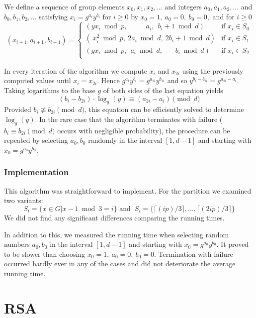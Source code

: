 \documentclass[a4paper, 11pt]{article}
\begin{document}
 We define a sequence of group elements $x_0, x_1, x_2, \ldots$ and integers $a_0, a_1, a_2, \ldots$ and $b_0, b_1, b_2, \ldots$ satisfying $x_i = g^{a_i}y^{b_i}$ for $i \ge 0$ by $x_0 = 1, ~a_0 = 0, ~b_0 = 0,$ and for $i \ge 0$  \[(x_{i+1},a_{i+1},b_{i+1}) = \left\{\begin{array}{lr} 
         (y x_i \bmod p,~~~~~~~~~~~~a_i,~~b_i + 1 \bmod d) & \textrm{if } x_i \in S_0\\ 
         (~x_i^2 \bmod p,~2 a_i \bmod d,~2 b_i + 1 \bmod d) & \textrm{if } x_i \in S_1\\ 
         (g x_i \bmod p,~~a_i \bmod d,~~~~~~~~b_i \bmod d) & \textrm{if } x_i \in S_2\\ 
     \end{array} \right. \] 
      
 In every iteration of the algorithm we compute $x_i$ and $x_{2i}$ using the previously computed values until $x_i = x_{2i}$. Hence $g^{a_i}y^{b_i} = g^{a_{2i}}y^{b_{2i}}$ and so $y^{b_i - b_{2i}} = g^{a_{2i} - a_i}$. Taking logarithms to the base $g$ of both sides of the last equation yields 
 \[ (b_i - b_{2i}) \cdot \log_g(y) \equiv (a_{2i} - a_i)\pmod d \] 
 Provided $b_i \not\equiv b_{2i} \pmod d$, this equation can be efficiently solved to determine $\log_g(y)$. 
 In the rare case that the algorithm terminates with failure ($b_i \equiv b_{2i} \pmod d$ occurs with negligible probability), the procedure can be repeated by selecting $a_0, b_0$ randomly in the interval $[1,d-1]$ and starting with $x_0 = 
  g^{a_0}y^{b_0}$. 
 
 \subsubsection{Implementation} 
 This algorithm was straightforward to implement. For the partition we examined two variants: 
 \[ 
 S_i = \{x \in G|x-1 \bmod 3 = i\} \textrm{ and } 
 ~S_i = \{\lceil (ip)/3 \rceil, \ldots, \lceil (2ip)/3 \rceil\} 
 \] 
 We did not find any significant differences comparing the running times. 
 
 In addition to this, we measured the running time when selecting random numbers $a_0, b_0$ in the interval $[1,d-1]$ and starting with $x_0 = g^{a_0}y^{b_0}$.  It proved to be slower than choosing $x_0 = 1,~a_0 = 0,~b_0 = 0$. 
 Termination with failure occurred hardly ever in any of the cases and did not deteriorate the average running time. 
 
 \section{RSA} 
\end{document}

